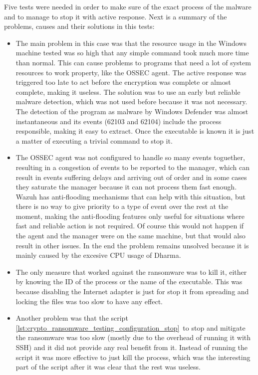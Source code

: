 \linej
Five tests were needed in order to make sure of the exact process of the malware and to manage to stop it with active response.
Next is a summary of the problems, causes and their solutions in this tests:
\begin{itemize}
	\item The main problem in this case was that the resource usage in the Windows machine tested was so high that any simple command took much more time than normal.
This can cause problems to programs that need a lot of system resources to work property, like the OSSEC agent.
The active response was triggered too late to act before the encryption was complete or almost complete, making it useless.
\linej
The solution was to use an early but reliable malware detection, which was not used before because it was not necessary.
The detection of the program as malware by Windows Defender was almost instantaneous and its events (62103 and 62104) include the process responsible, making it easy to extract.
Once the executable is known it is just a matter of executing a trivial command to stop it.

	\item The OSSEC agent was not configured to handle so many events toguether, resulting in a congestion of events to be reported to the manager, which can result in events suffering delays and arriving out of order and in some cases they saturate the manager because it can not process them fast enough.
\linej
Wazuh has anti-flooding mechanisms\cite{antiflooding} that can help with this situation, but there is no way to give priority to a type of event over the rest at the moment, making the anti-flooding features only useful for situations where fast and reliable action is not required.
Of course this would not happen if the agent and the manager were on the same machine, but that would also result in other issues.
In the end the problem remains unsolved because it is mainly caused by the excesive CPU usage of Dharma.

	\item The only measure that worked against the ransomware was to kill it, either by knowing the ID of the process or the name of the executable.
This was because disabling the Internet adapter is just for stop it from spreading and locking the files was too slow to have any effect.

	\item Another problem was that the script \ref{lst:crypto_ransomware_testing_configuration_stop}\ to stop and mitigate the ransomware was too slow (mostly due to the overhead of running it with SSH) and it did not provide any real benefit from it.
\linej
Instead of running the script it was more effective to just kill the process, which was the interesting part of the script after it was clear that the rest was useless.
\end{itemize}
